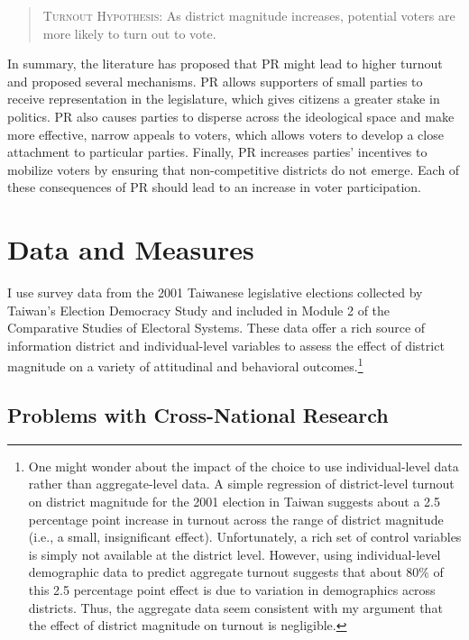 \documentclass[12pt]{article}
\begin{document}
\begin{quote}
\textsc{Turnout Hypothesis:} As district magnitude increases, potential voters are more likely to turn out to vote.
\end{quote}

In summary, the literature has proposed that PR might lead to higher turnout and proposed several mechanisms. PR allows supporters of small parties to receive representation in the legislature, which gives citizens a greater stake in politics. PR also causes parties to disperse across the ideological space and make more effective, narrow appeals to voters, which allows voters to develop a close attachment to particular parties. Finally, PR increases parties' incentives to mobilize voters by ensuring that non-competitive districts do not emerge. Each of these consequences of PR should lead to an increase in voter participation.

\section*{Data and Measures}

I use survey data from the 2001 Taiwanese legislative elections collected by Taiwan's Election Democracy Study and included in Module 2 of the Comparative Studies of Electoral Systems. These data offer a rich source of information district and individual-level variables to assess the effect of district magnitude on a variety of attitudinal and behavioral outcomes.\footnote{One might wonder about the impact of the choice to use individual-level data rather than aggregate-level data. A simple regression of district-level turnout on district magnitude for the 2001 election in Taiwan suggests about a 2.5 percentage point increase in turnout across the range of district magnitude (i.e., a small, insignificant effect). Unfortunately, a rich set of control variables is simply not available at the district level. However, using individual-level demographic data to predict aggregate turnout suggests that about 80\% of this 2.5 percentage point effect is due to variation in demographics across districts. Thus, the aggregate data seem consistent with my argument that the effect of district magnitude on turnout is negligible.} 

\subsection*{Problems with Cross-National Research}
\end{document}
